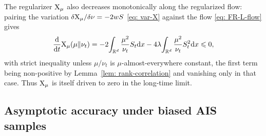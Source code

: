 \documentclass{article}
\begin{document}
\begin{remark}
The regularizer $\mathrm{X}_\mu$ also decreases monotonically along the regularized flow: pairing the variation $\delta\mathrm{X}_\mu/\delta\nu = -2wS$ \eqref{eq: var-X} against the flow \eqref{eq: FR-L-flow} gives
\begin{equation*}
    \frac{\mathrm{d}}{\mathrm{d} t}\mathrm{X}_\mu(\mu\|\nu_t) = -2\!\int_{\mathbb R^d}\frac{\mu^2}{\nu_t} S_t \mathrm{d} x - 4\lambda\!\int_{\mathbb R^d}\frac{\mu^2}{\nu_t} S_t^2 \mathrm{d} x  \leqslant  0,
\end{equation*}
with strict inequality unless $\mu/\nu_t$ is $\mu$-almost-everywhere constant, the first term being non-positive by Lemma~\ref{lem: rank-correlation} and vanishing only in that case. Thus $\mathrm{X}_\mu$ is itself driven to zero in the long-time limit.
\end{remark}

\subsection{Asymptotic accuracy under biased AIS samples}
\label{subsec: accuracy}
\end{document}
